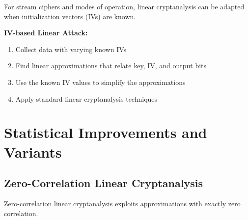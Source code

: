 \documentclass[12pt,a4paper]{article}
\begin{document}
For stream ciphers and modes of operation, linear cryptanalysis can be adapted when initialization vectors (IVs) are known.

\begin{attackbox}
\textbf{IV-based Linear Attack:}
\begin{enumerate}
    \item Collect data with varying known IVs
    \item Find linear approximations that relate key, IV, and output bits
    \item Use the known IV values to simplify the approximations
    \item Apply standard linear cryptanalysis techniques
\end{enumerate}
\end{attackbox}

\section{Statistical Improvements and Variants}

\subsection{Zero-Correlation Linear Cryptanalysis}

Zero-correlation linear cryptanalysis exploits approximations with exactly zero correlation.
\end{document}
